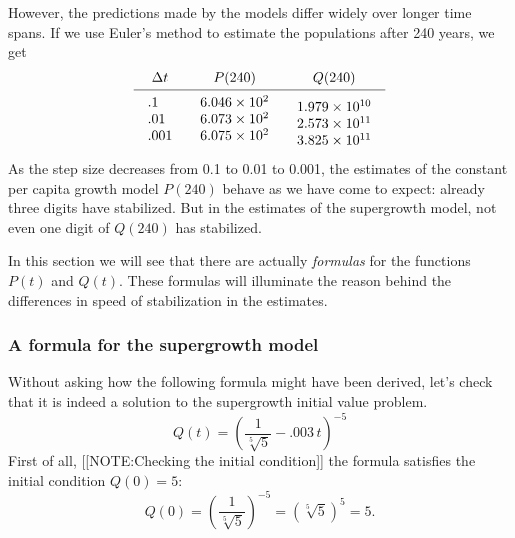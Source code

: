 However, the predictions made by the models differ widely over longer
time spans.  If we use Euler's method to estimate the populations
after 240 years, we get
	\[
\begin{array}{ccc}
	\Delta t	& P(240)	& Q(240)\label{Q(240)} \\
		[2pt] \hline
	\begin{array}{l}
	.1 \\ .01 \\ .001 
	\end{array}
	&
	\begin{array}{r}
	6.046 \times 10^2 \\ 
		6.073 \times 10^2 \\ 6.075 \times 10^2
	\end{array}
	&
	\begin{array}{r}
	\rule{0pt}{15pt} 1.979 \times 10^{10} \\ 
		2.573 \times 10^{11} \\ 3.825 \times 10^{11}
	\end{array}
	\end{array}
\]
As the step size decreases from 0.1 to 0.01 to 0.001, the estimates of
the constant per capita growth model $P(240)$ behave as we have come
to expect: already three digits have stabilized.  But in the estimates
of the supergrowth model, not even one digit of $Q(240)$ has
stabilized.

In this section we will see that there are actually {\em formulas\/}
for the functions $P(t)$ and $Q(t)$. These formulas will illuminate
the reason behind the differences in speed of stabilization in the
estimates.

\subsubsection{A formula for the supergrowth model}
\label{subsubsec:a-formula-for-the-supergrowth-model}

	Without asking how the following formula might have been derived, let's check that it is indeed a solution to the supergrowth initial value problem.
 	\[
Q(t) = \left( \frac{1}{\sqrt[5]{5}} - .003\,t
		\right)^{-5}
\]
First of all, 
	[[NOTE:Checking the  initial condition]]
the formula satisfies the initial condition $Q(0)=5$:
	\[
Q(0) = \left( \frac{1}{\sqrt[5]{5}} \right)^{-5} =
		(\sqrt[5]{5})^5 =5.
\]

